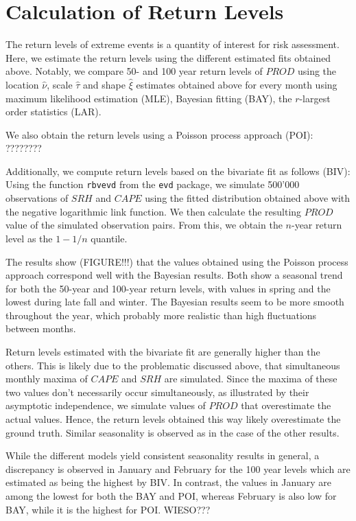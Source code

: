 \documentclass[10pt,conference,compsocconf]{IEEEtran}
\begin{document}
\section*{Calculation of Return Levels}
The return levels of extreme events is a quantity of interest for risk assessment. Here, we estimate the return levels using the different estimated fits obtained above. Notably, we compare 50- and 100 year return levels of $PROD$ using the location $\hat{\nu}$, scale $\hat{\tau}$ and shape $\hat{\xi}$ estimates obtained above for every month using maximum likelihood estimation (MLE), Bayesian fitting (BAY), the $r$-largest order statistics (LAR). 
\par
We also obtain the return levels using a Poisson process approach (POI): ????????
\par
Additionally, we compute return levels based on the bivariate fit as follows (BIV): Using the function \texttt{rbvevd} from the \texttt{evd} package, we simulate 500'000 observations of $SRH$ and $CAPE$ using the fitted distribution obtained above with the negative logarithmic link function. We then calculate the resulting $PROD$ value of the simulated observation pairs. From this, we obtain the $n$-year return level as the $1-1/n$ quantile. 
\par
The results show (FIGURE!!!) that the values obtained using the Poisson process approach correspond well with the Bayesian results. Both show a seasonal trend for both the 50-year and 100-year return levels, with values in spring and the lowest during late fall and winter. The Bayesian results seem to be more smooth throughout the year, which probably more realistic than high fluctuations between months. 
\par
Return levels estimated with the bivariate fit are generally higher than the others. This is likely due to the problematic discussed above, that simultaneous monthly maxima of $CAPE$ and $SRH$ are simulated. Since the maxima of these two values don't necessarily occur simultaneously, as illustrated by their asymptotic independence, we simulate values of $PROD$ that overestimate the actual values. Hence, the return levels obtained this way likely overestimate the ground truth. Similar seasonality is observed as in the case of the other results. 
\par
While the different models yield consistent seasonality results in general, a discrepancy is observed in January and February for the 100 year levels which are estimated as being the highest by BIV. In contrast, the values in January are among the lowest for both the BAY and POI, whereas February is also low for BAY, while it is the highest for POI. WIESO??? 
\end{document}
